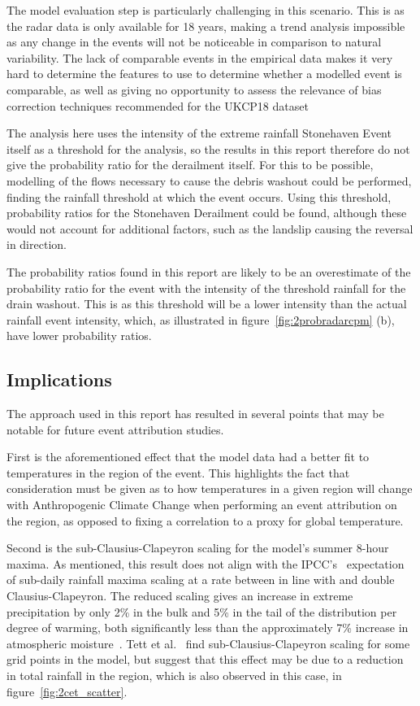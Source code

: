 The model evaluation step is particularly challenging in this scenario.
This is as the radar data is only available for 18 years,
    making a trend analysis impossible as any change in the events will not be noticeable
    in comparison to natural variability.
The lack of comparable events in the empirical data makes it very hard to determine the features to use to determine whether a modelled event is comparable,
    as well as giving no opportunity to assess the relevance of bias correction techniques recommended for the UKCP18 dataset~\cite{model_data}

The analysis here uses the intensity of the extreme rainfall Stonehaven Event itself as a threshold for the analysis,
    so the results in this report therefore do not give the probability ratio for the derailment itself.
For this to be possible,
    modelling of the flows necessary to cause the debris washout could be performed,
    finding the rainfall threshold at which the event occurs.
Using this threshold,
    probability ratios for the Stonehaven Derailment could be found,
    although these would not account for additional factors,
    such as the landslip causing the reversal in direction.

The probability ratios found in this report are likely to be an overestimate of the probability ratio for the event with the intensity of the threshold rainfall for the drain washout.
This is as this threshold will be a lower intensity than the actual rainfall event intensity,
    which, as illustrated in figure~\ref{fig:2probradarcpm} (b),
    have lower probability ratios.

\subsection{Implications}\label{subsec:disfield}

The approach used in this report has resulted in several points that may be notable for future event attribution studies.

First is the aforementioned effect that the model data had a better fit to temperatures in the region of the event.
This highlights the fact that consideration must be given as to how temperatures in a given region will
    change with Anthropogenic Climate Change when performing an event attribution on the region,
    as opposed to fixing a correlation to a proxy for global temperature.

Second is the sub-Clausius-Clapeyron scaling for the model's summer 8-hour maxima.
As mentioned, this result does not align with the IPCC's~\cite{IPCC_2021}
    expectation of sub-daily rainfall maxima scaling at a rate between in line with and double
    Clausius-Clapeyron.
The reduced scaling gives an increase in extreme precipitation by only 2\% in the bulk
    and 5\% in the tail of the distribution per degree of warming,
    both significantly less than the approximately 7\% increase in atmospheric moisture~\cite{Fowler_2021}.
Tett et al.~\cite{Tett_Soon} find sub-Clausius-Clapeyron scaling for some grid points in the model,
    but suggest that this effect may be due to a reduction in total rainfall in the region,
    which is also observed in this case, in figure~\ref{fig:2cet_scatter}.

